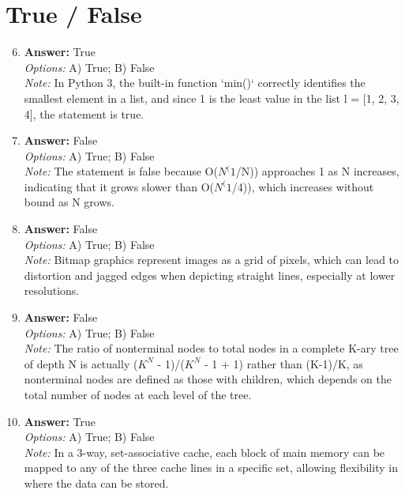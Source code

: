 \documentclass[12pt]{article}
\begin{document}
\section*{True / False}
\begin{enumerate}[label=\arabic*.]
\setcounter{enumi}{5}
\item \textbf{Answer:} True
\\ \textit{Options:} A) True; B) False
\\ \textit{Note:} In Python 3, the built-in function `min()` correctly identifies the smallest element in a list, and since 1 is the least value in the list l = [1, 2, 3, 4], the statement is true.
\item \textbf{Answer:} False
\\ \textit{Options:} A) True; B) False
\\ \textit{Note:} The statement is false because O($N^(1$/N)) approaches 1 as N increases, indicating that it grows slower than O($N^(1$/4)), which increases without bound as N grows.
\item \textbf{Answer:} False
\\ \textit{Options:} A) True; B) False
\\ \textit{Note:} Bitmap graphics represent images as a grid of pixels, which can lead to distortion and jagged edges when depicting straight lines, especially at lower resolutions.
\item \textbf{Answer:} False
\\ \textit{Options:} A) True; B) False
\\ \textit{Note:} The ratio of nonterminal nodes to total nodes in a complete K-ary tree of depth N is actually ($K^N$ - 1)/($K^N$ - 1 + 1) rather than (K-1)/K, as nonterminal nodes are defined as those with children, which depends on the total number of nodes at each level of the tree.
\item \textbf{Answer:} True
\\ \textit{Options:} A) True; B) False
\\ \textit{Note:} In a 3-way, set-associative cache, each block of main memory can be mapped to any of the three cache lines in a specific set, allowing flexibility in where the data can be stored.
\end{enumerate}
\end{document}
